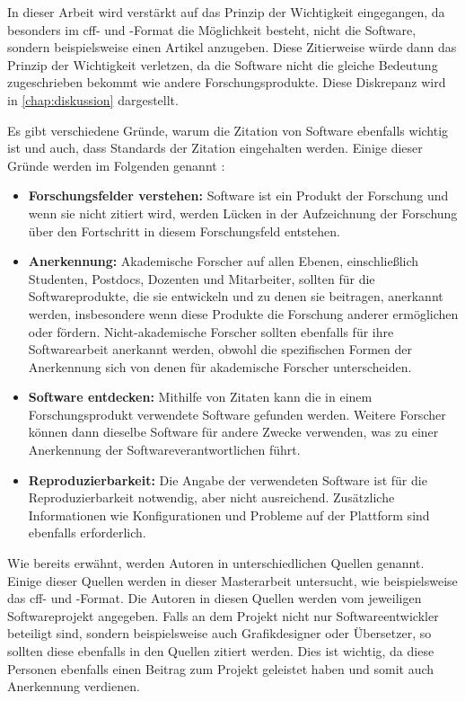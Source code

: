 In dieser Arbeit wird verstärkt auf das Prinzip der Wichtigkeit eingegangen, da besonders im \gls{cff}- und -Format die Möglichkeit besteht, nicht die Software, sondern beispielsweise einen Artikel anzugeben.
Diese Zitierweise würde dann das Prinzip der Wichtigkeit verletzen, da die Software nicht die gleiche Bedeutung zugeschrieben bekommt wie andere Forschungsprodukte.
Diese Diskrepanz wird in \autoref{chap:diskussion} dargestellt.

Es gibt verschiedene Gründe, warum die Zitation von Software ebenfalls wichtig ist und auch, dass Standards der Zitation eingehalten werden.
Einige dieser Gründe werden im Folgenden genannt \autocite{smith_software_2016}:

\begin{itemize}
    \item \textbf{Forschungsfelder verstehen:} Software ist ein Produkt der Forschung und wenn sie nicht zitiert wird, werden Lücken in der Aufzeichnung der Forschung über den Fortschritt in diesem Forschungsfeld entstehen.
    \item \textbf{Anerkennung:} Akademische Forscher auf allen Ebenen, einschließlich Studenten, Postdocs, Dozenten und Mitarbeiter, sollten für die Softwareprodukte, die sie entwickeln und zu denen sie beitragen, anerkannt werden, insbesondere wenn diese Produkte die Forschung anderer ermöglichen oder fördern. Nicht-akademische Forscher sollten ebenfalls für ihre Softwarearbeit anerkannt werden, obwohl die spezifischen Formen der Anerkennung sich von denen für akademische Forscher unterscheiden.
    \item \textbf{Software entdecken:} Mithilfe von Zitaten kann die in einem Forschungsprodukt verwendete Software gefunden werden. Weitere Forscher können dann dieselbe Software für andere Zwecke verwenden, was zu einer Anerkennung der Softwareverantwortlichen führt.
    \item \textbf{Reproduzierbarkeit:} Die Angabe der verwendeten Software ist für die Reproduzierbarkeit notwendig, aber nicht ausreichend. Zusätzliche Informationen wie Konfigurationen und Probleme auf der Plattform sind ebenfalls erforderlich.
\end{itemize}

Wie bereits erwähnt, werden Autoren in unterschiedlichen Quellen genannt.
Einige dieser Quellen werden in dieser Masterarbeit untersucht, wie beispielsweise das \gls{cff}- und -Format.
Die Autoren in diesen Quellen werden vom jeweiligen Softwareprojekt angegeben.
Falls an dem Projekt nicht nur Softwareentwickler beteiligt sind, sondern beispielsweise auch Grafikdesigner oder Übersetzer, so sollten diese ebenfalls in den Quellen zitiert werden.
Dies ist wichtig, da diese Personen ebenfalls einen Beitrag zum Projekt geleistet haben und somit auch Anerkennung verdienen.

